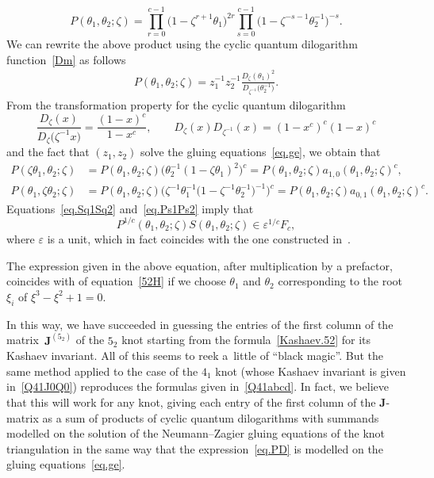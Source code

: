 \documentclass[pdftex]{sigma}
\numberwithin{equation}{section}
\def\z{\zeta}
\def\z{\zeta}
\def\ve{\varepsilon}
\def\bJ{J} \def\bJ{\mathbf{J}}
\def\sH{\mathcal H} %
\def\th{\theta}
\begin{document}
\[%
P(\th_1,\th_2;\z) = \prod_{r=0}^{c-1} \big(1-\zeta^{r+1} \th_1\big)^{2r}
\prod_{s=0}^{c-1} \big(1-\zeta^{-s-1}\th_2^{-1}\big)^{-s}.
\]
We can rewrite the above product using the cyclic quantum dilogarithm
function~\eqref{Dm} as follows%
\begin{gather}
\label{eq.PD}
P(\th_1,\th_2;\z)
= z_1^{-1} z_2^{-1}
\frac{D_\z(\th_1)^2}{D_{\z^{-1}}\big(\th_2^{-1}\big)} .
\end{gather}
From the transformation property for the cyclic quantum dilogarithm
\[%
\frac{D_\z(x)}{D_\z\big(\z^{-1}x\big)} =\frac{(1-x)^c}{1-x^c}, \qquad
D_\z(x) D_{\z^{-1}}(x) = (1-x^c)^c(1-x)^c
\]
and the fact that $(z_1,z_2)$ solve the gluing equations~\eqref{eq.ge}, we obtain that
\begin{subequations}\label{eq.Ps1Ps2}
\begin{align}
\label{eq.Ps1}
P(\zeta \th_1, \th_2;\z) &=
P(\th_1,\th_2;\z) \big( \th_2^{-1} (1-\zeta \th_1)^{2} \big)^c
= P(\th_1,\th_2;\z)  a_{1,0}(\th_1,\th_2;\z)^c, \\
\label{eq.Ps2}
P(\th_1, \zeta \th_2;\z) &= P(\th_1,\th_2;\z) \big(
\zeta^{-1} \th_1^{-1} \big(1-\zeta^{-1}\th_2^{-1}\big)^{-1} \big)^c
= P(\th_1,\th_2;\z)  a_{0,1}(\th_1,\th_2;\z)^c .
\end{align}
\end{subequations}
Equations~\eqref{eq.Sq1Sq2} and~\eqref{eq.Ps1Ps2}
imply that
\[%
P^{1/c}(\th_1,\th_2;\z) S(\th_1,\th_2;\z) \in \ve^{1/c} F_c,
\]
where $\ve$ is a unit, which in fact coincides with the one constructed
in~\cite{CGZ}.

The expression given in the above equation, after multiplication by
a prefactor, coincides with \smash{$\sH^{(i)}_{0,0}(x)$} of equation~\eqref{52H}
if we choose $\th_1$ and $\th_2$ corresponding to the root $\xi_i$ of
$\xi^3-\xi^2+1=0$.

In this way, we have succeeded in guessing the entries of the first column of
the mat\-rix~$\bJ^{(5_2)}$ of the $5_2$ knot starting from the formula~\eqref{Kashaev.52}
for its Kashaev invariant. All of this seems to reek a~little of ``black magic''.
But the same method applied to the case of the $4_1$ knot (whose Kashaev invariant
is given in~\eqref{Q41J0Q0}) reproduces the formulas given in~\eqref{Q41abcd}. In
fact, we believe that this will work for any knot, giving each entry of the first
column of the $\bJ$-matrix as a sum of products of cyclic quantum dilogarithms with
summands modelled on the solution of the Neumann--Zagier gluing equations of the knot
triangulation in the same way that the expression~\eqref{eq.PD} is modelled on the
gluing equations~\eqref{eq.ge}.
\end{document}
